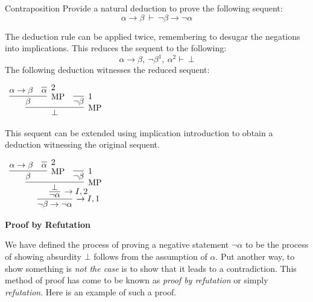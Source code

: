 \documentclass{book}
\begin{document}
    \begin{eg}{Contraposition}
        Provide a natural deduction to prove the following sequent: $$\alpha \to \beta \ \vdash \ \lnot\beta \to \lnot\alpha $$

        The deduction rule can be applied twice, remembering to desugar the negations into implications. This reduces the sequent to the following: $$\alpha \to \beta, \ \lnot\beta^{1}, \ \alpha^{2} \vdash \ \bot$$ The following deduction witnesses the reduced sequent: 

        \begin{center}
            $\begin{array}{c}
                \infer[\MP]{\bot}
                            {\infer[\MP]{\beta}
                                {\alpha \to \beta
                                &
                                \infer[2]{\alpha}{}}
                            &
                            \infer[1]{\lnot\beta}{}}
            \end{array}$
        \end{center}   
        
        This sequent can be extended using implication introduction to obtain a deduction witnessing the original sequent. 

        \begin{center}
            $\begin{array}{c}
                \infer[\to I,1]{\lnot\beta \to \lnot\alpha}
                    {\infer[\to I,2]{\lnot\alpha}
                        {\infer[\MP]{\bot}
                            {\infer[\MP]{\beta}
                                {\alpha \to \beta
                                &
                                \infer[2]{\alpha}{}}
                            &
                            \infer[1]{\lnot\beta}{}}}}
            \end{array}$
        \end{center}
    \end{eg}

    \begin{center}
        {\bf Proof by Refutation}
    \end{center}

    We have defined the process of proving a negative statement $\lnot\alpha$ to be the process of showing absurdity $\bot$ follows from the assumption of $\alpha$. Put another way, to show something is \emph{not the case} is to show that it leads to a contradiction. This method of proof has come to be known as \emph{proof by refutation} or simply \emph{refutation}. Here is an example of such a proof. 
\end{document}
